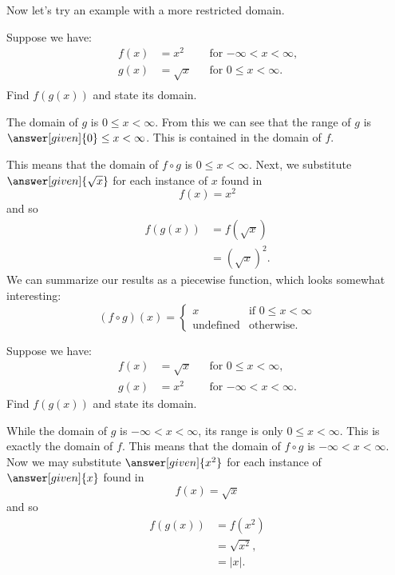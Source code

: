 \documentclass{ximera}
\begin{document}
Now let's try an example with a more restricted domain.

\begin{example}
 Suppose we have:
\begin{align*}
  f(x)&=x^2 &&\text{for $-\infty< x< \infty$,}\\
  g(x)&= \sqrt{x} &&\text{for $0\le x< \infty$.}\\
\end{align*}
Find $f(g(x))$ and state its domain.
\begin{explanation}
  The domain of $g$ is $0\le x< \infty$. From this we can see that the
  range of $g$ is $\answer[given]{0}\le x< \infty$. This is contained
  in the domain of $f$.

  This means that the domain of $f\circ g$ is $0\le x< \infty$.  Next,
  we substitute $\answer[given]{\sqrt{x}}$ for each instance of $x$
  found in
  \[
  f(x)={{x}^{2}}
  \]
  and so
  \begin{align*}
  f(g(x))&=f(\sqrt{x})\\
  &=\left(\sqrt{x}\right)^2.
  \end{align*}
  We can summarize our results as a piecewise function, which
  looks somewhat interesting:
  \[
  (f\circ g)(x) = 
  \begin{cases}
    x & \text{if $0\le x < \infty$}\\
   \text{undefined} &\text{otherwise}. 
  \end{cases}
  \]
\end{explanation}
\end{example}


\begin{example}
 Suppose we have:
\begin{align*}
  f(x)&=\sqrt{x} &&\text{for $0\le x< \infty$,}\\
  g(x)&= x^2 &&\text{for $-\infty< x< \infty$.}
\end{align*}
Find $f(g(x))$ and state its domain.
\begin{explanation}
  While the domain of $g$ is $-\infty< x< \infty$, its range is only
  $0 \le x<\infty$. This is exactly the domain of $f$. This means that
  the domain of $f\circ g$ is $-\infty< x< \infty$. %
  Now we may substitute $\answer[given]{x^2}$ for each instance of
  $\answer[given]{x}$ found in
  \[
  f(x)=\sqrt{x}
  \]
  and so
  \begin{align*}
  f(g(x))&=f(x^2)\\
  &=\sqrt{x^2},\\
  &=|x|.
  \end{align*}
\end{explanation}
\end{example}
\end{document}
